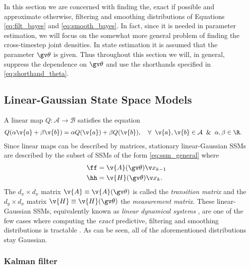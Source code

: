 
In this section we are concerned with finding the, exact if possible and approximate
otherwise, filtering and smoothing
distributions of Equations \eqref{eq:filt_bayes} and \eqref{eq:smooth_bayes}.
In fact, since it is needed in parameter estimation, we will focus on the somewhat 
more general problem of finding the cross-timestep joint densities. In state estimation 
it is assumed that the parameter $\Th$ is given.
Thus throughout this section we will, in general, suppress the dependence on $\Th$ 
and use the shorthands specified in \eqref{eq:shorthand_theta}. 

\subsection{Linear-Gaussian State Space Models}

A linear map $Q:\mathcal{A}\to\mathcal{B}$ satisfies the equation
\begin{align}
	Q(\alpha\v{a}+\beta\v{b}) &= \alpha Q(\v{a})+\beta Q(\v{b}), \quad \forall\;\; \v{a},\v{b}\in\mathcal{A}\;\;\&\;\;\alpha,\beta \in \R.
\end{align}%
%
Since linear maps can be described by matrices, stationary linear-Gaussian SSMs 
are described by the subset of SSMs of the form \eqref{eq:ssm_general} where  
\begin{align}
	\ff&=\v{A}(\Th)\x_{k-1}\\
	\hh&=\v{H}(\Th)\xk.
\end{align}
The $d_x\times d_x$ matrix $\v{A}\equiv\v{A}(\Th)$ is called the \emph{transition matrix} and
the $d_y\times d_x$ matrix $\v{H}\equiv \v{H}(\Th)$ the \emph{measurement matrix}.
These linear-Gaussian SSMs, equivalently known as \emph{linear dynamical systems} \parencite{Bishop2006},
are one of the few cases where computing the \emph{exact} predictive, filtering and
smoothing distributions is tractable \parencite[see, e.g.,][]{Sarkka2006}. As can be seen,
all of the aforementioned distributions stay Gaussian.

\subsubsection{Kalman filter}\label{sec:kalman_filter}


